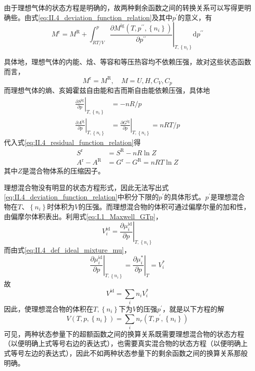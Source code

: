 \documentclass[main.tex]{subfiles}
\begin{document}
由于理想气体的状态方程是明确的，故两种剩余函数之间的转换关系可以写得更明确些。由式\eqref{eq:II.4_deviation_function_relation}及其中$p^\prime$的意义，有
\begin{equation}\label{eq:II.4_residual_function_relation}
    M^\text{r}=M^\text{R}+\int_{RT/V}^p\left.\frac{\partial M^\text{ig}\left(T,p^{\prime\prime},\left\{n_i\right\}\right)}{\partial p^{\prime\prime}}\right|_{T,\left\{n_i\right\}}\mathrm{d}p^{\prime\prime}
\end{equation}

具体地，理想气体的内能、焓、等容和等压热容均不依赖压强，故对这些状态函数而言，
\[M^\text{r}=M^\text{R},\quad M=U,H,C_V,C_p\]
而理想气体的熵、亥姆霍兹自由能和吉而斯自由能依赖压强，具体地
\begin{align*}
    \left.\frac{\partial S^\text{ig}}{\partial p}\right|_{T,\left\{n_i\right\}} & =-nR/p                                                                             \\
    \left.\frac{\partial A^\text{ig}}{\partial p}\right|_{T,\left\{n_i\right\}} & =\left.\frac{\partial G^\text{ig}}{\partial p}\right|_{T,\left\{n_i\right\}}=nRT/p
\end{align*}
代入式\eqref{eq:II.4_residual_function_relation}得
\begin{align*}
    S^\text{r}            & =S^\text{R}-nR\ln Z             \\
    A^\text{r}-A^\text{R} & =G^\text{r}-G^\text{R}=nRT\ln Z
\end{align*}
其中$Z$是混合物体系的压缩因子。

理想混合物没有明显的状态方程形式，因此无法写出式\eqref{eq:II.4_deviation_function_relation}中积分下限的$p^\prime$的具体形式。$p^\prime$是理想混合物在$T$、$\left\{n_i\right\}$时体积为$V$的压强。而理想混合物的体积可通过偏摩尔量的加和性，由偏摩尔体积表出。利用式\eqref{eq:I.1_Maxwell_GTp}，
\[V_i^\text{id}=\left.\frac{\partial \mu_i^\text{id}}{\partial p}\right|_{T,\left\{n_i\right\}}\]
而由式\eqref{eq:II.4_def_ideal_mixture_mu}，
\[\left.\frac{\partial \mu_i^\text{id}}{\partial p}\right|_{T,\left\{n_i\right\}}=\left.\frac{\partial\mu^*_i}{\partial p}\right|_T=V_i^*\]
故
\[V^\text{id}=\sum_in_iV_i^*\]
因此，使理想混合物的体积在$T,\left\{n_i\right\}$下为$V$的压强$p^\prime$，就是以下方程的解
\[V\left(T,p,\left\{n_i\right\}\right)=\sum_in_r\left(T,p^\prime,\left\{n_i\right\}\right)\]
可见，两种状态参量下的超额函数之间的换算关系既需要理想混合物的状态方程（以便明确上式等号右边的表达式），也需要真实混合物的状态方程（以便明确上式等号左边的表达式），因此不如两种状态参量下的剩余函数之间的换算关系那般明确。
\end{document}
